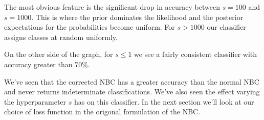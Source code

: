 The most obvious feature is the significant drop in accuracy between $s=100$ and $s=1000$.
This is where the prior dominates the likelihood and the posterior expectations for the probabilities become uniform.
For $s>1000$ our classifier assigns classes at random uniformly.

On the other side of the graph, for $s \leq 1$ we see a fairly consistent classifier with accuracy greater than 70\%.

We've seen that the corrected NBC has a greater accuracy than the normal NBC and never returns indeterminate classifications.
We've also seen the effect varying the hyperparameter $s$ has on this classifier.
In the next section we'll look at our choice of loss function in the origonal formulation of the NBC.